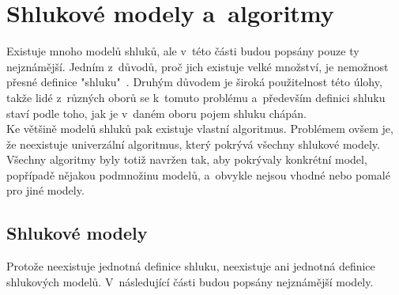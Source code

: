 
\section{Shlukové modely a~algoritmy} \label{sec:clustermodels}
Existuje mnoho modelů shluků, ale v~této části budou popsány pouze ty nejznámější. Jedním z~důvodů, proč jich existuje velké množství, je nemožnost přesné definice "shluku"~\cite{EstivillCastro02}. Druhým důvodem je široká použitelnost této úlohy, takže lidé z~různých oborů se k~tomuto problému a~především definici shluku staví podle toho, jak je v~daném oboru pojem shluku chápán.\\
Ke většině modelů shluků pak existuje vlastní algoritmus. Problémem ovšem je, že neexistuje univerzální algoritmus, který pokrývá všechny shlukové modely. Všechny algoritmy byly totiž navržen tak, aby pokrývaly konkrétní model, popřípadě nějakou podmnožinu modelů, a~obvykle nejsou vhodné nebo pomalé pro jiné modely.

\subsection{Shlukové modely}
Protože neexistuje jednotná definice shluku, neexistuje ani jednotná definice shlu\-ko\-vý\-ch modelů. V~následující části budou popsány nejznámější modely.

